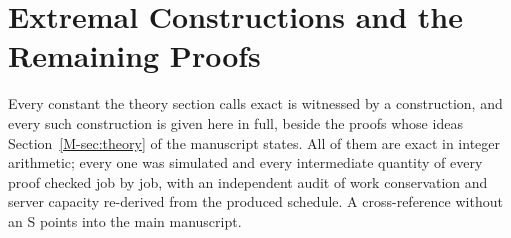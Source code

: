 \documentclass[mathematics,supfile,submit,moreauthors]{Definitions/mdpi}
\begin{document}



\section{Extremal Constructions and the Remaining Proofs}
\label{sec:supp_constructions}

Every constant the theory section calls exact is witnessed by a construction, and every
such construction is given here in full, beside the proofs whose ideas Section~\ref*{M-sec:theory} of the
manuscript states. All of them are exact in integer arithmetic; every one was simulated
and every intermediate quantity of every proof checked job by job, with an independent
audit of work conservation and server capacity re-derived from the produced schedule. A
cross-reference without an S points into the main manuscript.
\end{document}
